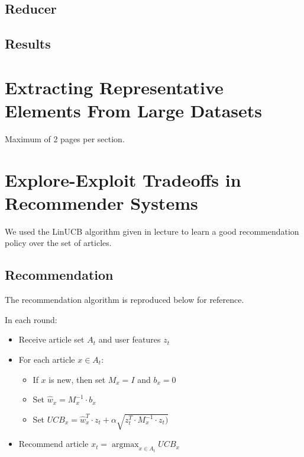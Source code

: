 \documentclass[a4paper, 11pt]{article}
\begin{document}
\subsection{Reducer}

\subsection{Results}

\section{Extracting Representative Elements From Large Datasets}
Maximum of 2 pages per section.

\newpage

\section{Explore-Exploit Tradeoffs in Recommender Systems}

We used the LinUCB algorithm given in lecture to learn a good recommendation policy over the set of articles.

\subsection{Recommendation}

The recommendation algorithm is reproduced below for reference.
\newline

In each round:
\begin{itemize}

\item Receive article set $A_t$ and user features $z_t$
\item For each article $x \in A_t$:

\begin{itemize}

    \item If $x$ is new, then set $M_x = I$ and $b_x = 0$
    \item Set $\hat{w}_x = M_x^{-1} \cdot b_x$
    \item Set $UCB_x = \hat{w}_x^T \cdot z_t + \alpha \sqrt{z_t^T \cdot M_x^{-1} \cdot z_t)}$

\end{itemize}
        
\item Recommend article $x_t = 
    \operatorname{argmax}_{x \in A_t} UCB_x$
        
\end {itemize}
\end{document}
